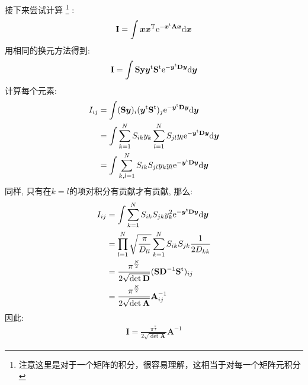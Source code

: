         接下来尝试计算
        \footnote{注意这里是对于一个矩阵的积分，很容易理解，这相当于对每一个矩阵元积分}
        :
        \begin{equation}
            \begin{aligned}
                \mathbf{I} = \int \bm{xx}^\mathrm{T} \mathrm{e}^{-\bm{x}^\mathrm{t}\mathbf{A}\bm{x}}\mathrm{d}\bm{x}
            \end{aligned}
        \end{equation}
        用相同的换元方法得到:
        \begin{equation}
            \begin{aligned}
                \mathbf{I} = \int \mathbf{S}\mathbf{y}\bm{y}^\mathrm{t}\mathbf{S}^\mathrm{t} \mathrm{e}^{-\bm{y}^\mathrm{t}\mathbf{D}\bm{y}}\mathrm{d}\bm{y}
            \end{aligned}
        \end{equation}
        计算每个元素: 
        \begin{equation}
            \begin{aligned}
                I_{ij} &= \int (\mathbf{S}\bm{y})_{i}(\bm{y}^\mathrm{t}\mathbf{S}^\mathrm{t})_{j} \mathrm{e}^{-\bm{y}^\mathrm{t}\mathbf{D}\bm{y}}\mathrm{d}\bm{y}\\
                &= \int\sum_{k=1}^{N} S_{ik}y_k \sum_{l=1}^{N} S_{jl} y_l \mathrm{e}^{-\bm{y}^\mathrm{t}\mathbf{D}\bm{y}}\mathrm{d}\bm{y}\\
                &= \int \sum_{k,l=1}^{N} S_{ik} S_{jl} y_k y_l \mathrm{e}^{-\bm{y}^\mathrm{t}\mathbf{D}\bm{y}}\mathrm{d}\bm{y}
            \end{aligned}
        \end{equation}
        同样, 只有在$k=l$的项对积分有贡献才有贡献, 那么:
        \begin{equation}
            \begin{aligned}
                I_{ij} &= \int \sum_{k=1}^{N} S_{ik} S_{jk}y_k^2 \mathrm{e}^{-\bm{y}^\mathrm{t}\mathbf{D}\bm{y}}\mathrm{d}\bm{y}\\
                &= \prod_{l=1}^{N} \sqrt{\frac {\pi}{D_{ll}}} \sum_{k=1}^N S_{ik} S_{jk} \frac 1{2D_{kk}}\\
                &= \frac {\pi^{\frac N2}}{2 \sqrt{\det{\mathbf{D}}}} (\mathbf{SD}^{-1}\mathbf{S}^\mathrm{t})_{ij}\\
                &= \frac {\pi^{\frac N2}}{2 \sqrt{\det{\mathbf{A}}}} \mathbf{A}^{-1}_{ij}
            \end{aligned}
        \end{equation}
        因此: 
        \begin{equation}
            \begin{aligned}
                \bm{I} = \frac {\pi^{\frac n2}}{2 \sqrt{\det{\bm{A}}}} \bm{A}^{-1}
            \end{aligned}
        \end{equation}
